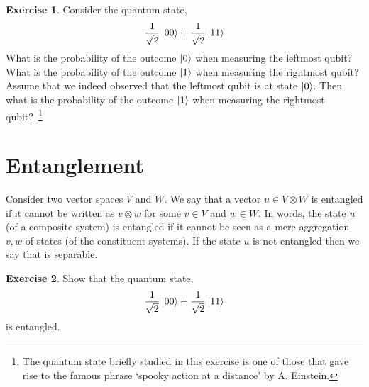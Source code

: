 \documentclass[a4paper, 11pt]{article}
\theoremstyle{definition}
\newtheorem{exercise}{Exercise}
\begin{document}
\begin{exercise}
  Consider the quantum state,
  \begin{align*}
    \frac{1}{\sqrt{2}} \ket{00} + \frac{1}{\sqrt{2}} \ket{11}
  \end{align*}
  What is the probability of the outcome $\ket{0}$ when measuring the
  leftmost qubit? What is the probability of the outcome $\ket{1}$
  when measuring the rightmost qubit? Assume that we indeed observed
  that the leftmost qubit is at state $\ket{0}$. Then what is the
  probability of the outcome $\ket{1}$ when measuring the rightmost
  qubit?~\footnote{The quantum state briefly studied in this exercise
    is one of those that gave rise to the famous phrase 
    `spooky action at a distance' by A. Einstein.}
\end{exercise}

\section{Entanglement}

Consider two vector spaces $V$ and $W$. We say that a vector
$u \in V \otimes W$ is entangled if it cannot be written as
$v \otimes w$ for some $v \in V$ and $w \in W$. In words, the state
$u$ (of a composite system) is entangled if it cannot be seen as a
mere aggregation $v, w$ of states (of the constituent systems). If the
state $u$ is not entangled then we say that is separable.

\begin{exercise}
  Show that the quantum state,
  \begin{align*}
    \frac{1}{\sqrt{2}} \ket{00} + \frac{1}{\sqrt{2}} \ket{11}
  \end{align*}
  is entangled.
\end{exercise}
\end{document}
